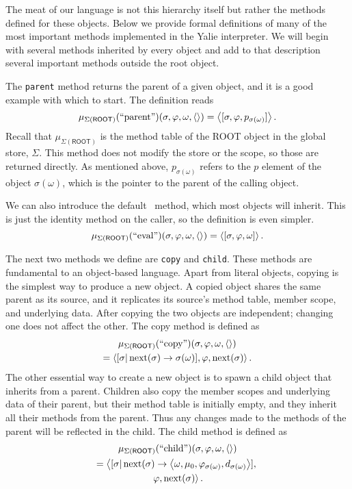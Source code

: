\documentclass[twocolumn]{article}
\begin{document}
The meat of our language is not this hierarchy itself but rather the
methods defined for these objects. Below we provide formal definitions
of many of the most important methods implemented in the Yalie
interpreter. We will begin with several methods inherited by every
object and add to that description several important methods outside
the root object.

The \texttt{parent} method returns the parent of a given object, and
it is a good example with which to start. The definition reads
\[ \mu_{\Sigma(\mathsf{ROOT})}(\text{``parent''})(\sigma,\varphi,\omega,
\left<\right>) = \left< [\sigma,\varphi,p_{\sigma(\omega)}] \right>. \] Recall that
$\mu_{\Sigma(\mathsf{ROOT})}$ is the method table of the \textsf{ROOT}
object in the global store, $\Sigma$. This method does not modify the
store or the scope, so those are returned directly. As mentioned
above, $p_{\sigma(\omega)}$ refers to the $p$ element of the object
$\sigma(\omega)$, which is the pointer to the parent of the calling
object.

We can also introduce the default \eval\ method, which most objects
will inherit. This is just the identity method on the caller, so the
definition is even simpler.
\[ \mu_{\Sigma(\mathsf{ROOT})}(\text{``eval''})(\sigma,\varphi,\omega,
\left<\right>) = \left< [\sigma,\varphi,\omega] \right>. \]

The next two methods we define are \texttt{copy} and
\texttt{child}. These methods are fundamental to an object-based
language. Apart from literal objects, copying is the simplest way to
produce a new object. A copied object shares the same parent as its
source, and it replicates its source's method table, member scope, and
underlying data. After copying the two objects are independent;
changing one does not affect the other. The copy method is defined as
\begin{multline*}
  \mu_{\Sigma(\mathsf{ROOT})}(\text{``copy''})(\sigma,\varphi,\omega,
\left<\right>) \\ = \left< [\sigma|\operatorname{next}(\sigma)\rightarrow\sigma(\omega)],\varphi,
\operatorname{next}(\sigma)\right>.
\end{multline*}
The other essential way to create a new object is to spawn a child
object that inherits from a parent. Children also copy the member
scopes and underlying data of their parent, but their method table is
initially empty, and they inherit all their methods from the
parent. Thus any changes made to the methods of the parent will be
reflected in the child. The child method is defined as
\begin{multline*}
  \mu_{\Sigma(\mathsf{ROOT})}(\text{``child''})(\sigma,\varphi,\omega,
  \left<\right>) \\ = \left< [\sigma|\operatorname{next}(\sigma)\rightarrow \left< \omega, \mu_0,
  \varphi_{\sigma(\omega)}, d_{\sigma(\omega)}\right>],\right.\\\left.\varphi,
  \operatorname{next}(\sigma)\right>.
\end{multline*}
\end{document}
